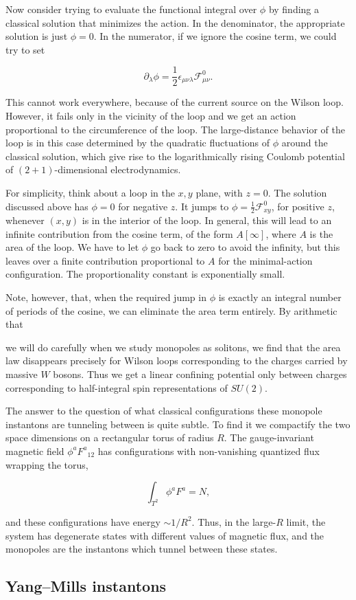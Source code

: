 Now consider trying to evaluate the functional integral over $\phi$ by finding a
classical solution that minimizes the action. In the denominator, the appropriate
solution is just $\phi=0$. In the numerator, if we ignore the cosine term, we
could try to set

\[
  \partial_\lambda\phi=\frac12\epsilon_{\mu\nu\lambda}
  \mathcal F^0_{\mu\nu}.
\]

This cannot work everywhere, because of the current source on the Wilson loop.
However, it fails only in the vicinity of the loop and we get an action
proportional to the circumference of the loop. The large-distance behavior of the
loop is in this case determined by the quadratic fluctuations of $\phi$ around
the classical solution, which give rise to the logarithmically rising Coulomb
potential of $(2+1)$-dimensional electrodynamics.

For simplicity, think about a loop in the $x,y$ plane, with $z=0$. The solution
discussed above has $\phi=0$ for negative $z$. It jumps to
$\phi=\tfrac12\mathcal F^0_{xy}$, for positive $z$, whenever $(x,y)$ is in the
interior of the loop. In general, this will lead to an infinite contribution
from the cosine term, of the form $A[\infty]$, where $A$ is the area of the loop.
We have to let $\phi$ go back to zero to avoid the infinity, but this leaves over
a finite contribution proportional to $A$ for the minimal-action configuration.
The proportionality constant is exponentially small.

Note, however, that, when the required jump in $\phi$ is exactly an integral
number of periods of the cosine, we can eliminate the area term entirely. By
arithmetic that

we will do carefully when we study monopoles as solitons, we find that the area
law disappears precisely for Wilson loops corresponding to the charges carried by
massive $W$ bosons. Thus we get a linear confining potential only between
charges corresponding to half-integral spin representations of $SU(2)$.

The answer to the question of what classical configurations these monopole
instantons are tunneling between is quite subtle. To find it we compactify the
two space dimensions on a rectangular torus of radius $R$. The gauge-invariant
magnetic field $\phi^aF^a{}_{12}$ has configurations with non-vanishing quantized
flux wrapping the torus,

\[
  \int_{T^2}\phi^aF^a=N,
\]

and these configurations have energy $\sim1/R^2$. Thus, in the large-$R$ limit,
the system has degenerate states with different values of magnetic flux, and the
monopoles are the instantons which tunnel between these states.

\subsection{Yang--Mills instantons}

\setcounter{footnote}{8}
